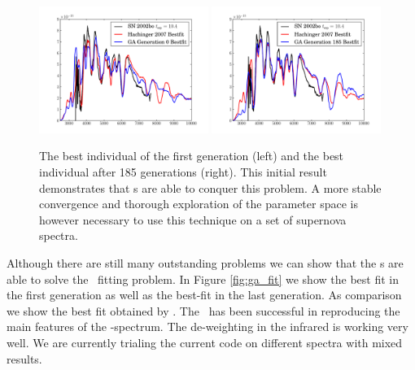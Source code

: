 \begin{figure}[htbp] %
   \centering
   \includegraphics[width=0.49\textwidth]{chapter_dalek/plots/plot_ga0_speccompare.pdf} 
   \includegraphics[width=0.49\textwidth]{chapter_dalek/plots/plot_ga185_speccompare.pdf} 
   \caption{The best individual of the first generation (left) and the best individual after 185 generations (right). This initial result demonstrates that \ga s are able to conquer this problem. A more stable convergence and thorough exploration of the parameter space is however necessary to use this technique on a set of supernova spectra.}
   \label{fig:example}
\end{figure}

Although there are still many outstanding problems we can show that the \ga s are able to solve the \sneia\ fitting problem. In Figure \ref{fig:ga_fit} we show the best fit in the first generation as well as the best-fit in the last generation. As comparison we show the best fit obtained by \citet{hachinger_dipl2007}. The \ga\ has been successful in reproducing the main features of the \sneia-spectrum. The de-weighting in the infrared is working very well. We are currently trialing the current code on different spectra with mixed results. 


